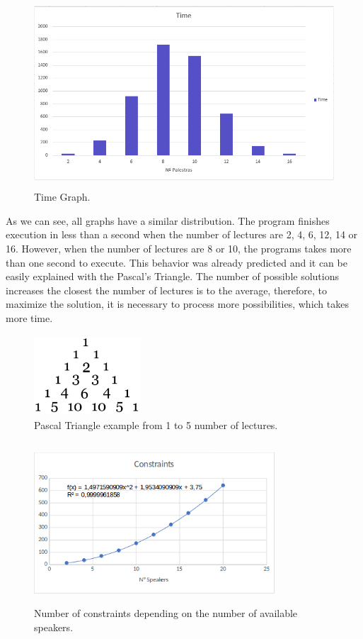 \documentclass[runningheads,a4paper]{llncs}
\begin{document}
\begin{figure}[!ht]
\centering
\includegraphics[width=11.5cm,height=7cm]{Time}
\caption{Time Graph.}
\label{fig:Time Graph}
\end{figure}

\clearpage
As we can see, all graphs have a similar distribution. The program finishes execution in less than a second when the number of lectures are  2, 4, 6, 12, 14 or 16. However, when the number of lectures are 8 or 10, the programs takes more than one second to execute. This behavior was already predicted and it can be easily explained with the Pascal's Triangle. The number of possible solutions increases the closest the number of lectures is to the average, therefore, to maximize the solution, it is necessary to process more possibilities, which takes more time.

\begin{figure}[!ht]
\centering
\includegraphics[width=4cm,height=3cm]{Pascal}
\caption{Pascal Triangle example from 1 to 5 number of lectures.}
\label{fig:Pascal Triangle}
\end{figure}

\begin{figure}[!ht]
\centering
\includegraphics[width=9cm,height=6cm]{Constraints}
\caption{Number of constraints depending on the number of available speakers.}
\label{fig:Constraints}
\end{figure}
\end{document}
